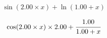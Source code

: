  

 
     

    \begin{dmath}
        \sin(2.00 \times x) + \ln(1.00 + x)
    \end{dmath}

    \begin{dmath}
        \cos(2.00 \times x) \times 2.00 + \cfrac{1.00}{1.00 + x}
    \end{dmath}
